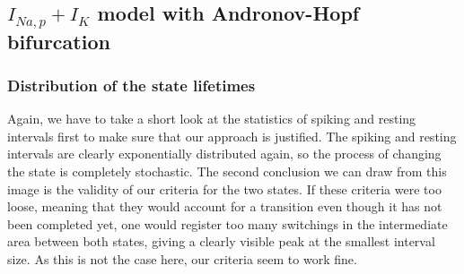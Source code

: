 \documentclass[12pt,a4paper]{article}
\begin{document}
\subsection{$I_{Na,p}+I_K$ model with Andronov-Hopf bifurcation}
\subsubsection{Distribution of the state lifetimes}
Again, we have to take a short look at the statistics of spiking and resting intervals first to make sure that our approach is justified. The spiking and resting intervals are clearly exponentially distributed again, so the process of changing the state is completely stochastic. The second conclusion we can draw from this image is the validity of our criteria for the two states. If these criteria were too loose, meaning that they would account for a transition even though it has not been completed yet, one would register too many switchings in the intermediate area between both states, giving a clearly visible peak at the smallest interval size. As this is not the case here, our criteria seem to work fine.
\end{document}
